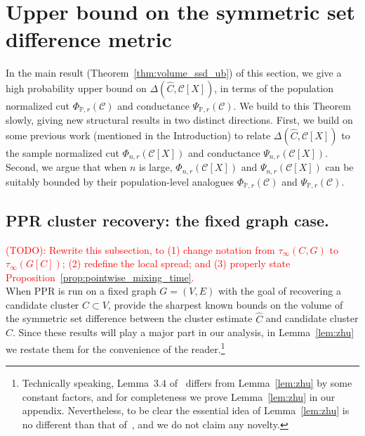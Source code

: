 \documentclass[11pt,twoside]{article}
\newcommand{\1}{\mathbf{1}}
\newcommand{\mc}[1]{\mathcal{#1}}
\newcommand{\Pbb}{\mathbb{P}}
\newcommand{\wh}[1]{\widehat{#1}}
\begin{document}
\section{Upper bound on the symmetric set difference metric}
\label{sec:ub_symmetric_set_difference}

In the main result (Theorem~\ref{thm:volume_ssd_ub}) of this section, we give a high probability upper bound on $\Delta(\wh{C}, \mc{C}[X])$, in terms of the population normalized cut $\Phi_{\Pbb,r}(\mc{C})$ and conductance $\Psi_{\Pbb,r}(\mc{C})$. We build to this Theorem slowly, giving new structural results in two distinct directions. First, we build on some previous work (mentioned in the Introduction) to relate $\Delta(\wh{C}, \mc{C}[X])$ to the sample normalized cut $\Phi_{n,r}(\mc{C}[X])$ and conductance $\Psi_{n,r}(\mc{C}[X])$. Second, we argue that when $n$ is large, $\Phi_{n,r}(\mc{C}[X])$ and $\Psi_{n,r}(\mc{C}[X])$ can be suitably bounded by their population-level analogues $\Phi_{\Pbb,r}(\mc{C})$ and $\Psi_{\Pbb,r}(\mc{C})$.

\subsection{PPR cluster recovery: the fixed graph case.}

\textcolor{red}{(TODO): Rewrite this subsection, to (1) change notation from $\tau_{\infty}(C,G)$ to $\tau_{\infty}(G[C])$; (2) redefine the local spread; and (3) properly state Proposition~\ref{prop:pointwise_mixing_time}.}\\

When PPR is run on a fixed graph $G = (V,E)$ with the goal of recovering a candidate cluster $C \subset V$, \cite{zhu2013} provide the sharpest known bounds on the volume of the symmetric set difference between the cluster estimate $\wh{C}$ and candidate cluster $C$. Since these results will play a major part in our analysis, in Lemma~\ref{lem:zhu} we restate them for the convenience of the reader.\footnote{Technically speaking, Lemma~3.4 of~\cite{zhu2013} differs from Lemma~\ref{lem:zhu} by some constant factors, and for completeness we prove Lemma~\ref{lem:zhu} in our appendix. Nevertheless, to be clear the essential idea of Lemma~\ref{lem:zhu} is no different than that of~\cite{zhu2013}, and we do not claim any novelty.}
\end{document}
